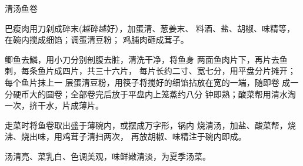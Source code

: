 \begin{recipe}{清汤鱼卷}

\ingredients


\cooking

巴瘦肉用刀剁成碎末(越碎越好），加蛋清、葱姜末、 料酒、盐、胡椒、味精等，在碗内搅成细馅；调蛋清豆粉； 鸡脯肉砸成茸子。

\step 鲫鱼去鱗，用小刀分别剖腹去脏，清洗干净，将鱼身 两面鱼肉片下，再片去鱼刺，每条鱼片成四片，共三十六片， 每片长约二寸、宽七分，用平盘分片摊开；每个鱼片抹上一 层蛋清豆粉，用筷子将搅好的细馅拈放在宽的一端，随即卷 成一分硬币大的圆卷；全部卷完后放于平盘内上笼蒸约八分 钟即熟；酸菜帮用清水淘一次，挤干水，片成薄片。

\step 走菜时将鱼卷取出盛于薄碗内，或摆成万字形，锅内 烧清汤，加盐、酸菜帮，烧沸、烧出味，用鸡茸子清扫两次， 再放胡椒、味精注于碗内即成。

\notes

汤清亮、菜乳白、色调美观，味鲜嫩清淡，为夏季汤菜。

\end{recipe}

